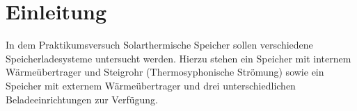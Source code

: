 \section{Einleitung}

In dem Praktikumsversuch Solarthermische Speicher sollen verschiedene Speicherladesysteme untersucht werden. Hierzu stehen ein Speicher mit internem Wärmeübertrager und Steigrohr (Thermosyphonische Strömung) sowie ein Speicher mit externem Wärmeübertrager und drei unterschiedlichen Beladeeinrichtungen zur Verfügung.
